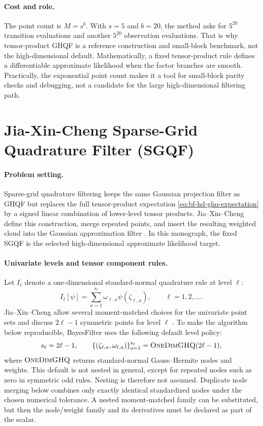 \paragraph{Cost and role.}
The point count is \(M=s^b\).  With \(s=5\) and \(b=20\), the method asks for
\(5^{20}\) transition evaluations and another \(5^{20}\) observation
evaluations.  That is why tensor-product GHQF is a reference construction and
small-block benchmark, not the high-dimensional default.  Mathematically, a
fixed tensor-product rule defines a differentiable approximate likelihood when
the factor branches are smooth.  Practically, the exponential point count makes
it a tool for small-block parity checks and debugging, not a candidate for the
large high-dimensional filtering path.

\section{Jia-Xin-Cheng Sparse-Grid Quadrature Filter (SGQF)}
\label{sec:bf-hd-sgqf}

\paragraph{Problem setting.}
Sparse-grid quadrature filtering keeps the same Gaussian projection filter as
GHQF but replaces the full tensor-product expectation
\eqref{eq:bf-hd-ghq-expectation} by a signed linear combination of lower-level
tensor products.  Jia--Xin--Cheng define this construction, merge repeated
points, and insert the resulting weighted cloud into the Gaussian approximation
filter \citep[Sections 2--3]{jia2012sparsegrid}.  In this monograph, the fixed
SGQF is the selected high-dimensional approximate likelihood target.

\paragraph{Univariate levels and tensor component rules.}
Let \(I_\ell\) denote a one-dimensional standard-normal quadrature rule at
level \(\ell\):
\[
  I_\ell[\psi]=\sum_{a=1}^{s_\ell}\omega_{\ell,a}\psi(\zeta_{\ell,a}),
  \qquad \ell=1,2,\ldots .
\]
Jia--Xin--Cheng allow several moment-matched choices for the univariate point
sets and discuss \(2\ell-1\) symmetric points for level \(\ell\)
\citep[Section 3.2]{jia2012sparsegrid}.  To make the algorithm below
reproducible, BayesFilter uses the following default level policy:
\[
  s_\ell=2\ell-1,\qquad
  \{(\zeta_{\ell,a},\omega_{\ell,a})\}_{a=1}^{s_\ell}
  =
  \textsc{OneDimGHQ}(2\ell-1),
  \label{eq:bf-hd-sgqf-level-policy}
\]
where \(\textsc{OneDimGHQ}\) returns standard-normal Gauss--Hermite nodes and
weights.  This default is not nested in general, except for repeated nodes such
as zero in symmetric odd rules.  Nesting is therefore not assumed.  Duplicate
node merging below combines only exactly identical standardized nodes under the
chosen numerical tolerance.  A nested moment-matched family can be substituted,
but then the node/weight family and its derivatives must be declared as part of
the scalar.

